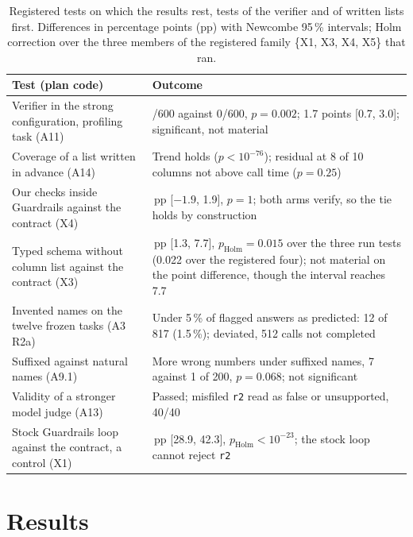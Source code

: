 \documentclass[journal]{IEEEtran}
\begin{document}
\begin{table}[!t]
\caption{Registered tests on which the results rest, tests of the verifier and
of written lists first. Differences in percentage points (pp) with Newcombe
95\,\% intervals; Holm correction over the three members of the registered
family \{X1, X3, X4, X5\} that ran.}
\label{tab:registered}
\centering
\footnotesize
\setlength{\tabcolsep}{2pt}
\begin{tabular}{@{}>{\raggedright\arraybackslash}p{2.75cm}>{\raggedright\arraybackslash}p{5.95cm}@{}}
\toprule
Test (plan code) & Outcome \\
\midrule
Verifier in the strong configuration, profiling task (A11) & 10/600 against 0/600, $p=0.002$; 1.7 points [0.7, 3.0]; significant, not material \\
Coverage of a list written in advance (A14) & Trend holds ($p<10^{-76}$); residual at 8 of 10 columns not above call time ($p=0.25$) \\
Our checks inside Guardrails against the contract (X4) & 0.0\,pp [$-1.9$, 1.9], $p=1$; both arms verify, so the tie holds by construction \\
Typed schema without column list against the contract (X3) & 4.0\,pp [1.3, 7.7], $p_{\mathrm{Holm}}=0.015$ over the three run tests (0.022 over the registered four); not material on the point difference, though the interval reaches 7.7 \\
Invented names on the twelve frozen tasks (A3 R2a) & Under 5\,\% of flagged answers as predicted: 12 of 817 (1.5\,\%); deviated, 512 calls not completed \\
Suffixed against natural names (A9.1) & More wrong numbers under suffixed names, 7 against 1 of 200, $p=0.068$; not significant \\
Validity of a stronger model judge (A13) & Passed; misfiled \texttt{r2} read as false or unsupported, 40/40 \\
Stock Guardrails loop against the contract, a control (X1) & 35.5\,pp [28.9, 42.3], $p_{\mathrm{Holm}}<10^{-23}$; the stock loop cannot reject \texttt{r2} \\
\bottomrule
\end{tabular}
\end{table}

\section{Results}\label{sec:results}
\end{document}
